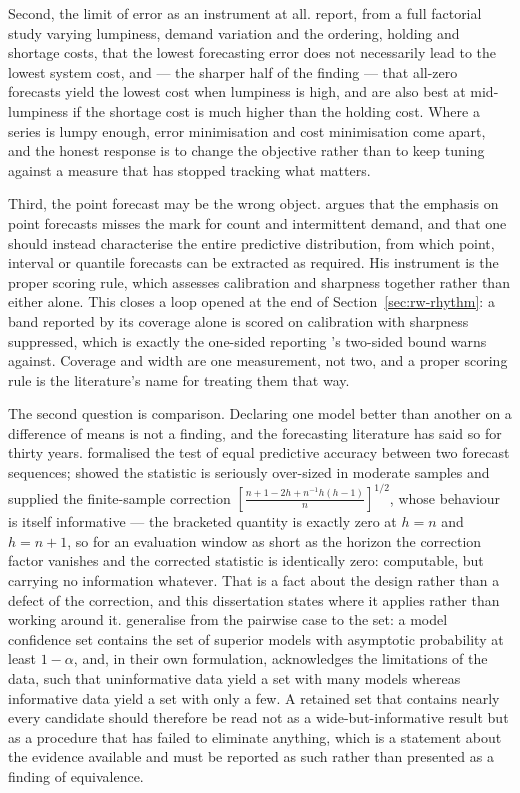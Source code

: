Second, the limit of error as an instrument at all.
\citet{chatfield_all-zero_2007} report, from a full factorial study varying
lumpiness, demand variation and the ordering, holding and shortage costs, that
the lowest forecasting error does not necessarily lead to the lowest system
cost, and --- the sharper half of the finding --- that all-zero forecasts yield
the lowest cost when lumpiness is high, and are also best at mid-lumpiness if
the shortage cost is much higher than the holding cost. Where a series is lumpy
enough, error minimisation and cost minimisation come apart, and the honest
response is to change the objective rather than to keep tuning against a
measure that has stopped tracking what matters.

Third, the point forecast may be the wrong object.
\citet{kolassa_evaluating_2016} argues that the emphasis on point forecasts
misses the mark for count and intermittent demand, and that one should instead
characterise the entire predictive distribution, from which point, interval or
quantile forecasts can be extracted as required. His instrument is the proper
scoring rule, which assesses calibration and sharpness together rather than
either alone. This closes a loop opened at the end of
Section~\ref{sec:rw-rhythm}: a band reported by its coverage alone is scored on
calibration with sharpness suppressed, which is exactly the one-sided reporting
\citet{angelopoulos_conformal_2023}'s two-sided bound warns against. Coverage
and width are one measurement, not two, and a proper scoring rule is the
literature's name for treating them that way.

The second question is comparison. Declaring one model better than another on a
difference of means is not a finding, and the forecasting literature has said
so for thirty years. \citet{diebold_comparing_1995} formalised the test of
equal predictive accuracy between two forecast sequences;
\citet{harvey_testing_1997} showed the statistic is seriously over-sized in
moderate samples and supplied the finite-sample correction
$\left[\frac{n + 1 - 2h + n^{-1}h(h-1)}{n}\right]^{1/2}$, whose behaviour is
itself informative --- the bracketed quantity is exactly zero at $h = n$ and
$h = n+1$, so for an evaluation window as short as the horizon the correction
factor vanishes and the corrected statistic is identically zero: computable,
but carrying no information whatever. That is a fact about the design rather
than a defect of the correction, and this dissertation states where it applies
rather than working around it. \citet{hansen_model_2011} generalise from the
pairwise case to the set: a model confidence set contains the set of superior
models with asymptotic probability at least $1 - \alpha$, and, in their own
formulation, acknowledges the limitations of the data, such that uninformative
data yield a set with many models whereas informative data yield a set with
only a few. A retained set that contains nearly every candidate should
therefore be read not as a wide-but-informative result but as a procedure that
has failed to eliminate anything, which is a statement about the evidence
available and must be reported as such rather than presented as a finding of
equivalence.

